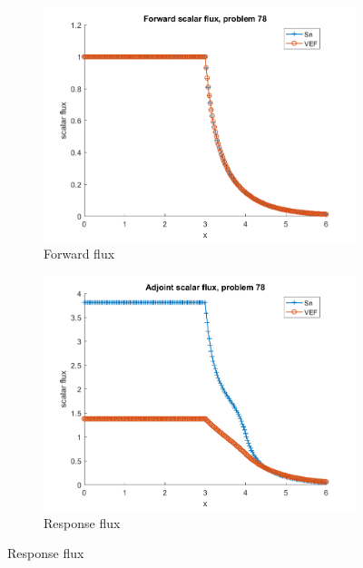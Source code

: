 \documentclass{article}
\begin{document}
\begin{figure}[H]
\label{Case78Flux}
\centering
\begin{subfigure}{.5\textwidth}
  \centering
  \includegraphics[width=.98\linewidth]{IanProposal/figures2/78phi.png}
  \caption{Forward flux}
  \label{fig:sfig1}
\end{subfigure}%
\begin{subfigure}{.5\textwidth}
  \centering
  \includegraphics[width=.98\linewidth]{IanProposal/figures2/78phia.png}
  \caption{Response flux}
  \label{fig:sfig4}
\end{subfigure}%
\end{figure}
\end{document}
